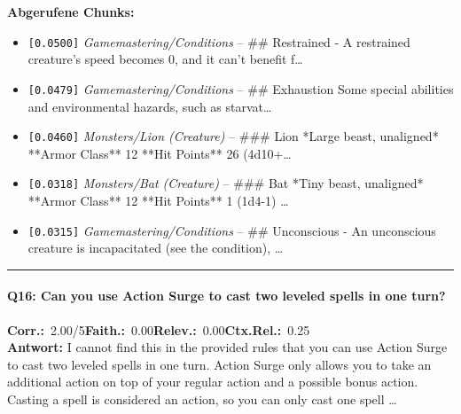 \noindent\textbf{Abgerufene Chunks:}
\begin{itemize}[noitemsep, topsep=2pt]
  \item[\textbf{\#1}] \texttt{[0.0500]} \textit{Gamemastering/Conditions} -- \#\# Restrained  - A restrained creature's speed becomes 0, and it can't benefit f\ldots
  \item[\textbf{\#2}] \texttt{[0.0479]} \textit{Gamemastering/Conditions} -- \#\# Exhaustion  Some special abilities and environmental hazards, such as starvat\ldots
  \item[\textbf{\#3}] \texttt{[0.0460]} \textit{Monsters/Lion (Creature)} -- \#\#\# Lion  *Large beast, unaligned*  **Armor Class** 12  **Hit Points** 26 (4d10+\ldots
  \item[\textbf{\#4}] \texttt{[0.0318]} \textit{Monsters/Bat (Creature)} -- \#\#\# Bat  *Tiny beast, unaligned*  **Armor Class** 12  **Hit Points** 1 (1d4-1)  \ldots
  \item[\textbf{\#5}] \texttt{[0.0315]} \textit{Gamemastering/Conditions} -- \#\# Unconscious  - An unconscious creature is incapacitated (see the condition), \ldots
\end{itemize}
\vspace{4pt}
\hrule
\vspace{6pt}

\paragraph{Q16: Can you use Action Surge to cast two leveled spells in one turn?}
\noindent \textbf{Corr.:}~2.00/5\quad \textbf{Faith.:}~0.00\quad \textbf{Relev.:}~0.00\quad \textbf{Ctx.Rel.:}~0.25\\

\noindent\textbf{Antwort:} I cannot find this in the provided rules that you can use Action Surge to cast two leveled spells in one turn. Action Surge only allows you to take an additional action on top of your regular action and a possible bonus action. Casting a spell is considered an action, so you can only cast one spell \ldots

